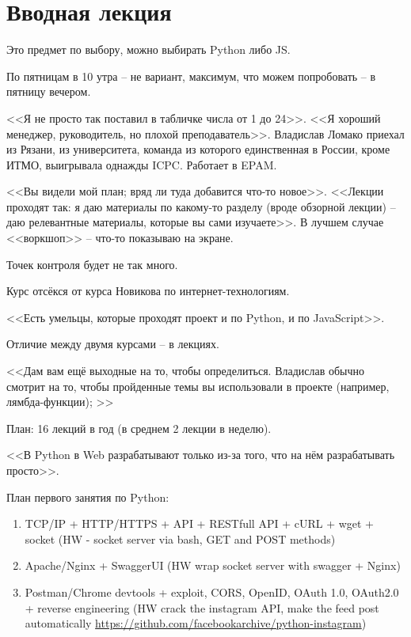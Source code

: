 \documentclass[main.tex]{subfiles}
\begin{document}
\setcounter{section}{-1}

\section{Вводная лекция}

Это предмет по выбору, можно выбирать Python либо JS.

По пятницам в 10 утра -- не вариант, максимум, что можем попробовать -- в пятницу вечером.

<<Я не просто так поставил в табличке числа от 1 до 24>>.
<<Я хороший менеджер, руководитель, но плохой преподаватель>>.
Владислав Ломако приехал из Рязани, из университета, команда из которого единственная в России, кроме ИТМО, выигрывала однажды ICPC.
Работает в EPAM.

<<Вы видели мой план; вряд ли туда добавится что-то новое>>.
<<Лекции проходят так: я даю материалы по какому-то разделу (вроде обзорной лекции) -- даю релевантные материалы, которые вы сами изучаете>>.
В лучшем случае <<воркшоп>> -- что-то показываю на экране.

Точек контроля будет не так много.


Курс отсёкся от курса Новикова по интернет-технологиям.

<<Есть умельцы, которые проходят проект и по Python, и по JavaScript>>.

Отличие между двумя курсами -- в лекциях.

<<Дам вам ещё выходные на то, чтобы определиться. Владислав обычно смотрит на то, чтобы пройденные темы вы использовали в проекте (например, лямбда-функции); >>

План: 16 лекций в год (в среднем 2 лекции в неделю).

<<В Python в Web разрабатывают только из-за того, что на нём разрабатывать просто>>.

\begin{leftbar}

    План первого занятия по Python:

    \begin{enumerate}[noitemsep]
        \item TCP/IP + HTTP/HTTPS + API + RESTfull API + cURL + wget + socket  (HW - socket server via bash, GET and POST methods)
        \item Apache/Nginx  + SwaggerUI (HW wrap socket server with swagger + Nginx)
        \item Postman/Chrome devtools + exploit, CORS, OpenID, OAuth 1.0, OAuth2.0 + reverse engineering (HW crack the instagram API, make the feed post automatically \url{https://github.com/facebookarchive/python-instagram})
    \end{enumerate}

\end{leftbar}
\end{document}
